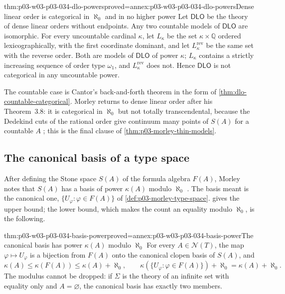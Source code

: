 \begin{hbtheorem}{thm:p03-w03-p03-034-dlo-powers}{proved=annex:p03-w03-p03-034-dlo-powers}{Dense linear order is categorical in \(\aleph_0\) and in no higher power}
Let \(\mathsf{DLO}\) be the theory of dense linear orders without
endpoints. Any two countable models of \(\mathsf{DLO}\) are isomorphic.
For every uncountable cardinal \(\kappa\), let \(L_\kappa\) be the set
\(\kappa\times\mathbb Q\) ordered lexicographically, with the first
coordinate dominant, and let \(L_\kappa^{\mathrm{rev}}\) be the same set
with the reverse order. Both are models of \(\mathsf{DLO}\) of power
\(\kappa\); \(L_\kappa\) contains a strictly increasing sequence of
order type \(\omega_1\), and \(L_\kappa^{\mathrm{rev}}\) does not.
Hence \(\mathsf{DLO}\) is not categorical in any uncountable power.
\end{hbtheorem}

The countable case is Cantor's back-and-forth theorem in the form of
\cref{thm:dlo-countable-categorical}. Morley returns to dense linear order
after his Theorem~3.8: it is categorical in \(\aleph_0\) but not totally
transcendental, because the Dedekind cuts of the rational order give
continuum many points of \(S(A)\) for a countable \(A\)
\cite[p.~528]{Morley1965}; this is the final clause of
\cref{thm:p03-morley-thin-models}.

\subsection{The canonical basis of a type space}
\label{sec:p03-w03-p03-034-basis}

After defining the Stone space \(S(A)\) of the formula algebra \(F(A)\),
Morley notes that \(S(A)\) has a basis of power \(\kappa(A)\) modulo
\(\aleph_0\) \cite[p.~518]{Morley1965}. The basis meant is the canonical
one, \(\{U_\varphi:\varphi\in F(A)\}\) of
\cref{def:p03-morley-type-space}.  gives the
upper bound; the lower bound, which makes the count an equality modulo
\(\aleph_0\), is the following.

\begin{hblemma}{thm:p03-w03-p03-034-basis-power}{proved=annex:p03-w03-p03-034-basis-power}{The canonical basis has power \(\kappa(A)\) modulo \(\aleph_0\)}
For every \(A\in\mathcal N(T)\), the map \(\varphi\mapsto U_\varphi\) is a
bijection from \(F(A)\) onto the canonical clopen basis of \(S(A)\), and
\[
 \kappa(A)\leq\kappa(F(A))\leq\kappa(A)+\aleph_0 ,
 \qquad
 \kappa(\{U_\varphi:\varphi\in F(A)\})+\aleph_0=\kappa(A)+\aleph_0 .
\]
The modulus cannot be dropped: if \(\Sigma\) is the theory of an infinite
set with equality only and \(A=\varnothing\), the canonical basis has
exactly two members.
\end{hblemma}

